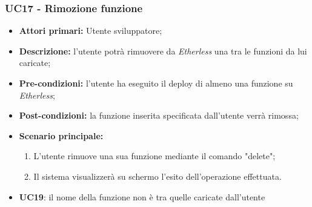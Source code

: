 \subsubsection{UC17 - Rimozione funzione}
\begin{itemize}
	\item \textbf{Attori primari:} Utente sviluppatore;
	\item \textbf{Descrizione:} l'utente potrà rimuovere da \textit{Etherless} una tra le funzioni da lui caricate;
	\item \textbf{Pre-condizioni:} l'utente ha eseguito il deploy di almeno una funzione su \textit{Etherless};
	\item \textbf{Post-condizioni:} la funzione inserita specificata dall'utente verrà rimossa;
	\item \textbf{Scenario principale:}
	\begin{enumerate}
		\item L'utente rimuove una sua funzione mediante il comando "delete";
		\item Il sistema visualizzerà su schermo l'esito dell'operazione effettuata.
	\end{enumerate}
\end{itemize}
\begin{itemize}
  \item \textbf{UC19}: il nome della funzione non è tra quelle caricate dall'utente
\end{itemize}
